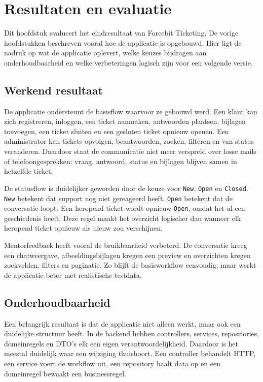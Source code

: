 
\chapter{Resultaten en evaluatie}%
\label{ch:resultaten}

Dit hoofdstuk evalueert het eindresultaat van Forcebit Ticketing. De vorige hoofdstukken beschreven vooral hoe de applicatie is opgebouwd. Hier ligt de nadruk op wat de applicatie oplevert, welke keuzes bijdragen aan onderhoudbaarheid en welke verbeteringen logisch zijn voor een volgende versie.

\section{Werkend resultaat}

De applicatie ondersteunt de basisflow waarvoor ze gebouwd werd. Een klant kan zich registreren, inloggen, een ticket aanmaken, antwoorden plaatsen, bijlagen toevoegen, een ticket sluiten en een gesloten ticket opnieuw openen. Een administrator kan tickets opvolgen, beantwoorden, zoeken, filteren en van status veranderen. Daardoor staat de communicatie niet meer verspreid over losse mails of telefoongesprekken: vraag, antwoord, status en bijlagen blijven samen in hetzelfde ticket.

De statusflow is duidelijker geworden door de keuze voor \texttt{New}, \texttt{Open} en \texttt{Closed}. \texttt{New} betekent dat support nog niet gereageerd heeft. \texttt{Open} betekent dat de conversatie loopt. Een heropend ticket wordt opnieuw \texttt{Open}, omdat het al een geschiedenis heeft. Deze regel maakt het overzicht logischer dan wanneer elk heropend ticket opnieuw als nieuw zou verschijnen.

Mentorfeedback heeft vooral de bruikbaarheid verbeterd. De conversatie kreeg een chatweergave, afbeeldingsbijlagen kregen een preview en overzichten kregen zoekvelden, filters en paginatie. Zo blijft de basisworkflow eenvoudig, maar werkt de applicatie beter met realistische testdata.

\section{Onderhoudbaarheid}

Een belangrijk resultaat is dat de applicatie niet alleen werkt, maar ook een duidelijke structuur heeft. In de backend hebben controllers, services, repositories, domeinregels en DTO's elk een eigen verantwoordelijkheid. Daardoor is het meestal duidelijk waar een wijziging thuishoort. Een controller behandelt HTTP, een service voert de workflow uit, een repository haalt data op en een domeinregel bewaakt een businessregel.

